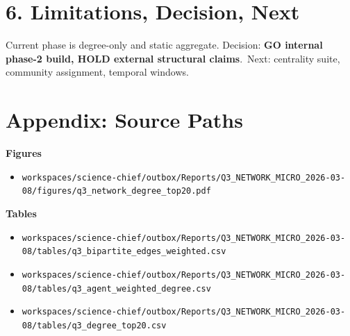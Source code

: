 \documentclass[11pt,a4paper]{article}
\begin{document}
\section*{6. Limitations, Decision, Next}
Current phase is degree-only and static aggregate.
Decision: \textbf{GO internal phase-2 build, HOLD external structural claims}.\
Next: centrality suite, community assignment, temporal windows.

\section*{Appendix: Source Paths}
\textbf{Figures}\\
\begin{itemize}
\item \texttt{workspaces/science-chief/outbox/Reports/Q3\_NETWORK\_MICRO\_2026-03-08/figures/q3\_network\_degree\_top20.pdf}
\end{itemize}
\textbf{Tables}\\
\begin{itemize}
\item \texttt{workspaces/science-chief/outbox/Reports/Q3\_NETWORK\_MICRO\_2026-03-08/tables/q3\_bipartite\_edges\_weighted.csv}
\item \texttt{workspaces/science-chief/outbox/Reports/Q3\_NETWORK\_MICRO\_2026-03-08/tables/q3\_agent\_weighted\_degree.csv}
\item \texttt{workspaces/science-chief/outbox/Reports/Q3\_NETWORK\_MICRO\_2026-03-08/tables/q3\_degree\_top20.csv}
\end{itemize}
\end{document}
